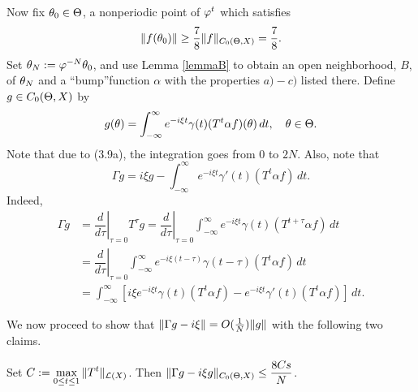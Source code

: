 \begin{pf}
Now fix  $\theta_0\in \Theta$, a nonperiodic point of $\varphi^t$ which
satisfies
\begin{equation}\lb{SMT-4}
\|f(\th_0)\| \ge\dfrac{7}{8}\|f\|_{C_0(\TH,X)} = \dfrac{7}{8}.
\end{equation}
Set $\theta_N:=\varphi^{-N}\theta_0$, and use Lemma \ref{lemmaB}
to obtain an open neighborhood, $B$, of $\theta_N$ and a ``bump''function
$\alpha$ with the properties $a)-c)$ listed there.
Define $g\in C_0(\Theta,X)$ by
\begin{equation}\lb{defing}
g(\th) = \int^{\infty}_{-\infty} e^{-i\xi t}\gamma(t) (T^t\alpha
f)(\th)\,dt,\quad \th\in \TH.
\end{equation}
Note that due to (3.9a), the integration goes from $0$ to $2N$.
Also, note that
\[
\Gamma g = i\xi g
-\int^{\infty}_{-\infty}e^{-i\xi t}\gamma'(t)(T^t\alpha f)\,dt.
\]
Indeed,
$$\begin{aligned}
\Gamma g &= \left.\dfrac{d}{d\tau}\right|_{\tau=0} T^{\tau}g
=\left.\dfrac{d}{d\tau}\right|_{\tau=0} \int^{\infty}_{-\infty}
    e^{-i\xi t}\gamma(t)(T^{t+\tau}\alpha f)\,dt\\
&= \left.\dfrac{d}{d\tau}\right|_{\tau=0}\int^{\infty}_{-\infty}
   e^{-i\xi (t-\tau)}\gamma(t-\tau)(T^t\alpha f)\,dt\\
&=\int^{\infty}_{-\infty}
\left[i\xi e^{-i\xi t}\gamma(t) (T^t \alpha
f)-e^{-i\xi t}\gamma'(t) (T^t \alpha f)\right]\,dt.
\end{aligned}$$

We now proceed to show that $\|\Gamma g-i\xi\|=O({1\over N})\|g\|$
with the following two claims.

\begin{claimone}
Set $\displaystyle{C:=\max_{0\le t\le 1}\|T^t\|_{\calL(X)}}$. Then
$\displaystyle{\|\Gamma g-i\xi g\|_{C_0(\Theta,X)} \le \frac{8Cs}{N} }$.
\end{claimone}


\end{pf}
